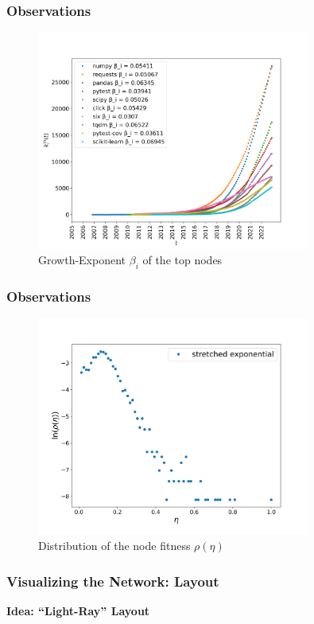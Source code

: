 \documentclass[fleqn]{beamer}
\begin{document}
    \begin{frame}
        \frametitle{Observations}
        \begin{figure}[htpb]
            \centering
            \includegraphics[width=0.8\textwidth]{./pics/edge_growth.png}
            \caption{Growth-Exponent $\beta_i$ of the top nodes}
        \end{figure}
    \end{frame}

    \begin{frame}
        \frametitle{Observations}
        \begin{figure}[htpb]
            \centering
            \includegraphics[width=0.8\textwidth]{./pics/fitness.png}
            \caption{Distribution of the node fitness $\rho(\eta)$}
        \end{figure}
    \end{frame}

    \begin{frame}
        \frametitle{Visualizing the Network: Layout}
        \centering \textbf{Idea: ``Light-Ray'' Layout}
    \end{frame}
\end{document}
